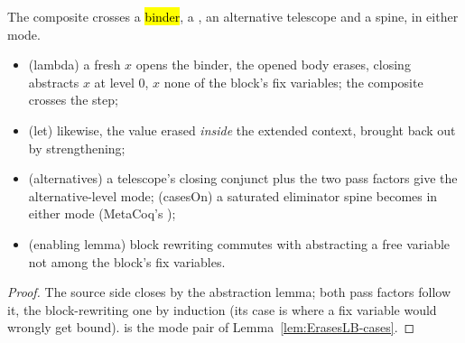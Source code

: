 \begin{lemma}
\label{lem:ErasesLBMode-lam}
\leanok
{}
 The composite crosses a \hl{binder}, a , an alternative telescope and a
 spine, in either mode.
\begin{itemize}
\item {} (lambda) a fresh $x$ opens the binder, the opened body erases, closing abstracts $x$
at level $0$, $x$ none of the block's fix variables;  the composite crosses the step;
\item (let) likewise, the value erased \emph{inside} the extended context, brought back out by
strengthening;
\item (alternatives) a telescope's closing conjunct plus the two pass factors give the alternative-level
mode; (casesOn) a saturated eliminator spine becomes  in either mode (MetaCoq's );
\item (enabling lemma) block rewriting commutes with abstracting a free variable not among the block's
fix variables.
\end{itemize}
\end{lemma}
\begin{proof}
\leanok
{}
 The source side closes by the abstraction lemma; both pass factors follow it, the
block-rewriting one by induction (its  case is where a fix variable would wrongly get bound).
 is the mode pair of Lemma~\ref{lem:ErasesLB-cases}.
\end{proof}

